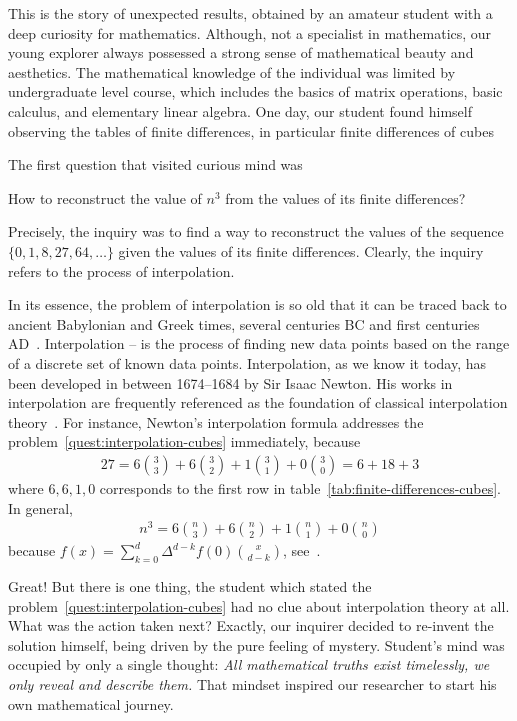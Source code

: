 This is the story of unexpected results, obtained by an amateur
student with a deep curiosity for mathematics.
Although, not a specialist in mathematics,
our young explorer always possessed a strong sense of mathematical beauty and aesthetics.
The mathematical knowledge of the individual was limited by undergraduate level course, which includes the basics of
matrix operations, basic calculus, and elementary linear algebra.
One day, our student found himself observing the tables of finite differences,
in particular finite differences of cubes


The first question that visited curious mind was
\begin{problem}
    \label{quest:interpolation-cubes}
    How to reconstruct the value of $n^3$ from the values of its finite differences?
\end{problem}
Precisely, the inquiry was to find a way to reconstruct the values of the sequence $\{0, 1, 8, 27, 64, \ldots\}$
given the values of its finite differences.
Clearly, the inquiry refers to the process of interpolation.

In its essence, the problem of interpolation is so old that it can be traced back
to ancient Babylonian and Greek times, several centuries BC and first centuries AD~\cite{gautschi2012interpolation}.
Interpolation -- is the process of finding new data points based on the range of a discrete set
of known data points.
Interpolation, as we know it today, has been developed in between 1674--1684 by Sir Isaac Newton.
His works in interpolation are frequently referenced as
the foundation of classical interpolation theory~\cite{meijering2002chronology}.
For instance, Newton's interpolation formula addresses the problem~\eqref{quest:interpolation-cubes} immediately,
because
\begin{align*}
    27 = 6 \binom{3}{3} + 6 \binom{3}{2} + 1 \binom{3}{1} + 0\binom{3}{0} = 6 + 18 + 3
\end{align*}
where $6,6,1,0$ corresponds to the first row in table~\eqref{tab:finite-differences-cubes}.
In general,
\begin{align*}
    n^3 = 6 \binom{n}{3} + 6 \binom{n}{2} + 1\binom{n}{1} + 0 \binom{n}{0}
\end{align*}
because $f(x) = \sum_{k=0}^{d} \Delta^{d-k} f(0) \binom{x}{d-k}$, see~\cite[~p. 190]{graham1994concrete}.

Great!
But there is one thing, the student which stated the problem~\eqref{quest:interpolation-cubes}
had no clue about interpolation theory at all.
What was the action taken next?
Exactly, our inquirer decided to re-invent the solution himself, being driven by the pure feeling of mystery.
Student's mind was occupied by only a single thought:
\textit{All mathematical truths exist timelessly, we only reveal and describe them.}
That mindset inspired our researcher to start his own mathematical journey.

